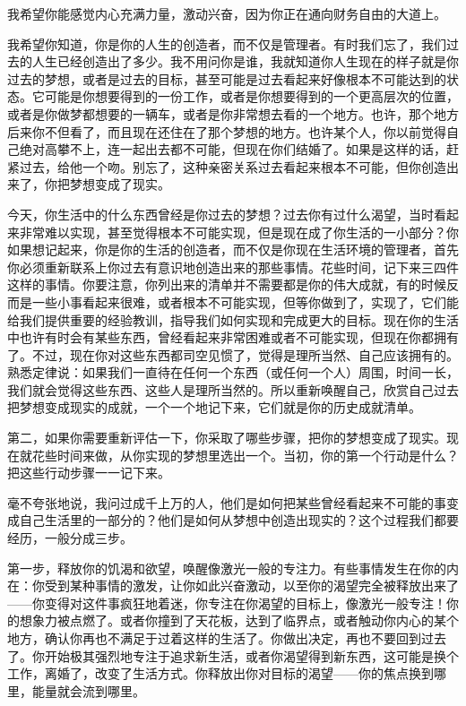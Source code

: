 我希望你能感觉内心充满力量，激动兴奋，因为你正在通向财务自由的大道上。

我希望你知道，你是你的人生的创造者，而不仅是管理者。有时我们忘了，我们过去的人生已经创造出了多少。我不用问你是谁，我就知道你人生现在的样子就是你过去的梦想，或者是过去的目标，甚至可能是过去看起来好像根本不可能达到的状态。它可能是你想要得到的一份工作，或者是你想要得到的一个更高层次的位置，或者是你做梦都想要的一辆车，或者是你非常想去看的一个地方。也许，那个地方后来你不但看了，而且现在还住在了那个梦想的地方。也许某个人，你以前觉得自己绝对高攀不上，连一起出去都不可能，但现在你们结婚了。如果是这样的话，赶紧过去，给他一个吻。别忘了，这种亲密关系过去看起来根本不可能，但你创造出来了，你把梦想变成了现实。

今天，你生活中的什么东西曾经是你过去的梦想？过去你有过什么渴望，当时看起来非常难以实现，甚至觉得根本不可能实现，但是现在成了你生活的一小部分？你如果想记起来，你是你的生活的创造者，而不仅是你现在生活环境的管理者，首先你必须重新联系上你过去有意识地创造出来的那些事情。花些时间，记下来三四件这样的事情。你要注意，你列出来的清单并不需要都是你的伟大成就，有的时候反而是一些小事看起来很难，或者根本不可能实现，但等你做到了，实现了，它们能给我们提供重要的经验教训，指导我们如何实现和完成更大的目标。现在你的生活中也许有时会有某些东西，曾经看起来非常困难或者不可能实现，但现在你都拥有了。不过，现在你对这些东西都司空见惯了，觉得是理所当然、自己应该拥有的。熟悉定律说：如果我们一直待在任何一个东西（或任何一个人）周围，时间一长，我们就会觉得这些东西、这些人是理所当然的。所以重新唤醒自己，欣赏自己过去把梦想变成现实的成就，一个一个地记下来，它们就是你的历史成就清单。

第二，如果你需要重新评估一下，你采取了哪些步骤，把你的梦想变成了现实。现在就花些时间来做，从你实现的梦想里选出一个。当初，你的第一个行动是什么？把这些行动步骤一一记下来。

毫不夸张地说，我问过成千上万的人，他们是如何把某些曾经看起来不可能的事变成自己生活里的一部分的？他们是如何从梦想中创造出现实的？这个过程我们都要经历，一般分成三步。

第一步，释放你的饥渴和欲望，唤醒像激光一般的专注力。有些事情发生在你的内在：你受到某种事情的激发，让你如此兴奋激动，以至你的渴望完全被释放出来了——你变得对这件事疯狂地着迷，你专注在你渴望的目标上，像激光一般专注！你的想象力被点燃了。或者你撞到了天花板，达到了临界点，或者触动你内心的某个地方，确认你再也不满足于过着这样的生活了。你做出决定，再也不要回到过去了。你开始极其强烈地专注于追求新生活，或者你渴望得到新东西，这可能是换个工作，离婚了，改变了生活方式。你释放出你对目标的渴望——你的焦点换到哪里，能量就会流到哪里。

